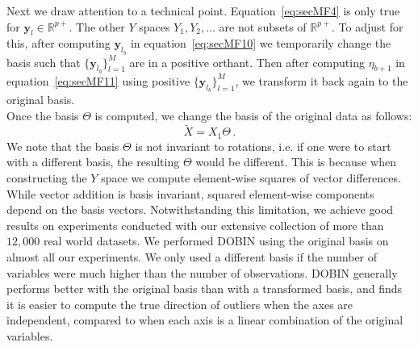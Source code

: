 \documentclass[11pt]{article}
\begin{document}
Next we draw attention to a technical point. Equation~\ref{eq:secMF4} is only true for  $\bm{y}_l \in \mathbb{R}^{p+}$. The other $Y$ spaces $Y_1, Y_2, \ldots $ are not  subsets of $\mathbb{R}^{p+}$. To adjust for this, after computing  $\bm{y}_{l_{b}}$ in equation~\eqref{eq:secMF10} we temporarily change the basis such that  $\{ \bm{y}_{l_{b}}\}_{l=1}^M$ are in a positive orthant.  Then after computing  $\eta_{b+1}$ in equation~\eqref{eq:secMF11} using positive $\{ \bm{y}_{l_{b}}\}_{l=1}^M$,  we transform it back again to the original basis.  \\

Once the basis $\Theta$  is computed, we  change the basis of the original data as follows:
\begin{equation}\label{eq:secMF14}
    \tilde{X} = X_1 \Theta \, .
\end{equation}
We note that the basis $\Theta$ is not invariant to rotations, i.e. if one were to start with a different basis, the resulting $\Theta$ would be different. This is because when constructing the $Y$ space we compute element-wise squares of vector differences. While vector addition is basis invariant, squared element-wise components depend on the basis vectors. Notwithstanding this limitation, we achieve good results on experiments conducted with our extensive collection of more than $12,000$ real world datasets. We performed DOBIN using the original basis on almost all our experiments. We only used a different basis if the number of variables  were much higher than the number of observations.  DOBIN generally performs better with the original basis than with a transformed basis, and finds it  is easier to compute the true direction of outliers when the axes are independent, compared to when each axis is a linear combination of the original variables. 


\end{document}

